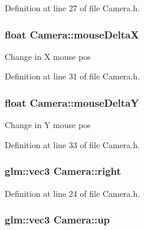 Definition at line 27 of file Camera.\+h.

\hypertarget{class_camera_a38f42e9b04d2180f267af1bdd5b87216}{}
\subsubsection[{mouse\+Delta\+X}]{\setlength{\rightskip}{0pt plus 5cm}float Camera\+::mouse\+Delta\+X\hspace{0.3cm}{\ttfamily [private]}}\label{class_camera_a38f42e9b04d2180f267af1bdd5b87216}
Change in X mouse pos 

Definition at line 31 of file Camera.\+h.

\hypertarget{class_camera_a65944911597dcfb60e21300ed8c62305}{}
\subsubsection[{mouse\+Delta\+Y}]{\setlength{\rightskip}{0pt plus 5cm}float Camera\+::mouse\+Delta\+Y\hspace{0.3cm}{\ttfamily [private]}}\label{class_camera_a65944911597dcfb60e21300ed8c62305}
Change in Y mouse pos 

Definition at line 33 of file Camera.\+h.

\hypertarget{class_camera_aebffcc6289dd99df7554b18d00a81161}{}
\subsubsection[{right}]{\setlength{\rightskip}{0pt plus 5cm}glm\+::vec3 Camera\+::right\hspace{0.3cm}{\ttfamily [private]}}\label{class_camera_aebffcc6289dd99df7554b18d00a81161}


Definition at line 24 of file Camera.\+h.

\hypertarget{class_camera_a3fe5f351380fb118ffc600591769f049}{}
\subsubsection[{up}]{\setlength{\rightskip}{0pt plus 5cm}glm\+::vec3 Camera\+::up\hspace{0.3cm}{\ttfamily [private]}}\label{class_camera_a3fe5f351380fb118ffc600591769f049}


